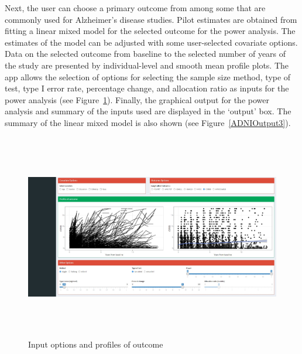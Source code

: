 Next, the user can choose a primary outcome from among some that are  commonly used for Alzheimer's disease studies. Pilot estimates are obtained from fitting a linear mixed model for the selected outcome for the power analysis. The estimates of the model can be adjusted with some user-selected covariate options. Data on the selected outcome from baseline to the selected number of years of the study are presented by individual-level and smooth mean profile plots. The app allows the selection of options for selecting the sample size method, type of test, type I error rate, percentage change, and allocation ratio as inputs for the power analysis (see Figure~\ref{ADNIOutput2}). Finally, the graphical output for the power analysis and summary of the inputs used are displayed in the `output' box. The summary of the linear mixed model is also shown (see Figure~\ref{ADNIOutput3}). 

\begin{figure}[ht]
	\includegraphics[width=14cm,height=9cm]{./Figures/FigADNIOutput2.jpg}
	\caption{Input options and profiles of outcome}\label{ADNIOutput2}
\end{figure}

